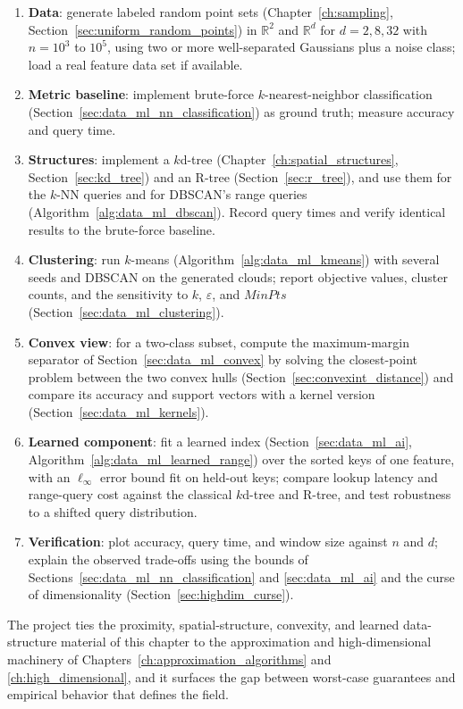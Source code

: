 \begin{enumerate}
  \item \textbf{Data}: generate labeled random point sets
    (Chapter~\ref{ch:sampling}, Section~\ref{sec:uniform_random_points}) in
    $\mathbb{R}^2$ and $\mathbb{R}^d$ for $d = 2, 8, 32$ with $n = 10^3$ to
    $10^5$, using two or more well-separated Gaussians plus a noise class;
    load a real feature data set if available.
  \item \textbf{Metric baseline}: implement brute-force $k$-nearest-neighbor
    classification (Section~\ref{sec:data_ml_nn_classification}) as ground
    truth; measure accuracy and query time.
  \item \textbf{Structures}: implement a $k$d-tree
    (Chapter~\ref{ch:spatial_structures}, Section~\ref{sec:kd_tree}) and an
    R-tree (Section~\ref{sec:r_tree}), and use them for the $k$-NN queries
    and for DBSCAN's range queries (Algorithm~\ref{alg:data_ml_dbscan}).
    Record query times and verify identical results to the brute-force
    baseline.
  \item \textbf{Clustering}: run $k$-means
    (Algorithm~\ref{alg:data_ml_kmeans}) with several seeds and DBSCAN on
    the generated clouds; report objective values, cluster counts, and the
    sensitivity to $k$, $\varepsilon$, and $\mathit{MinPts}$
    (Section~\ref{sec:data_ml_clustering}).
  \item \textbf{Convex view}: for a two-class subset, compute the
    maximum-margin separator of Section~\ref{sec:data_ml_convex} by solving
    the closest-point problem between the two convex hulls
    (Section~\ref{sec:convexint_distance}) and compare its accuracy and
    support vectors with a kernel version (Section~\ref{sec:data_ml_kernels}).
  \item \textbf{Learned component}: fit a learned index
    (Section~\ref{sec:data_ml_ai}, Algorithm~\ref{alg:data_ml_learned_range})
    over the sorted keys of one feature, with an $\ell_\infty$ error bound
    fit on held-out keys; compare lookup latency and range-query cost
    against the classical $k$d-tree and R-tree, and test robustness to a
    shifted query distribution.
  \item \textbf{Verification}: plot accuracy, query time, and window size
    against $n$ and $d$; explain the observed trade-offs using the bounds of
    Sections~\ref{sec:data_ml_nn_classification} and
    \ref{sec:data_ml_ai} and the curse of dimensionality
    (Section~\ref{sec:highdim_curse}).
\end{enumerate}
The project ties the proximity, spatial-structure, convexity, and learned
data-structure material of this chapter to the approximation and
high-dimensional machinery of Chapters~\ref{ch:approximation_algorithms}
and \ref{ch:high_dimensional}, and it surfaces the gap between worst-case
guarantees and empirical behavior that defines the field.
